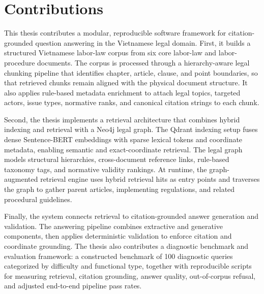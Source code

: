 \section{Contributions}
This thesis contributes a modular, reproducible software framework for citation-grounded question answering in the Vietnamese legal domain. First, it builds a structured Vietnamese labor-law corpus from six core labor-law and labor-procedure documents. The corpus is processed through a hierarchy-aware legal chunking pipeline that identifies chapter, article, clause, and point boundaries, so that retrieved chunks remain aligned with the physical document structure. It also applies rule-based metadata enrichment to attach legal topics, targeted actors, issue types, normative ranks, and canonical citation strings to each chunk.

Second, the thesis implements a retrieval architecture that combines hybrid indexing and retrieval with a Neo4j legal graph. The Qdrant indexing setup fuses dense Sentence-BERT embeddings with sparse lexical tokens and coordinate metadata, enabling semantic and exact-coordinate retrieval. The legal graph models structural hierarchies, cross-document reference links, rule-based taxonomy tags, and normative validity rankings. At runtime, the graph-augmented retrieval engine uses hybrid retrieval hits as entry points and traverses the graph to gather parent articles, implementing regulations, and related procedural guidelines.

Finally, the system connects retrieval to citation-grounded answer generation and validation. The answering pipeline combines extractive and generative components, then applies deterministic validation to enforce citation and coordinate grounding. The thesis also contributes a diagnostic benchmark and evaluation framework: a constructed benchmark of 100 diagnostic queries categorized by difficulty and functional type, together with reproducible scripts for measuring retrieval, citation grounding, answer quality, out-of-corpus refusal, and adjusted end-to-end pipeline pass rates.

